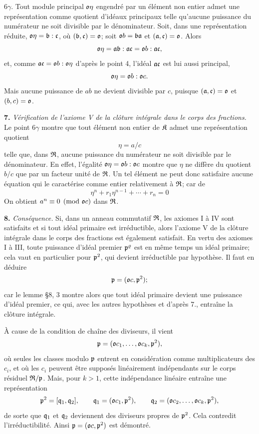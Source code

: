 6$\gamma$. Tout module principal $\mathfrak{o}\eta$ engendré par un élément non entier admet une représentation comme quotient d'idéaux principaux telle qu'aucune puissance du numérateur ne soit divisible par le dénominateur. Soit, dans une représentation réduite, $\mathfrak{o}\eta=\mathfrak{b}:\mathfrak{c}$, où $(\mathfrak{b},\mathfrak{c})=\mathfrak{o}$; soit $\mathfrak{o} b=\mathfrak{b}\mathfrak{a}$ et $(\mathfrak{a},\mathfrak{c})=\mathfrak{o}$. Alors
\[
        \mathfrak{o}\eta=\mathfrak{a}\mathfrak{b}:\mathfrak{a}\mathfrak{c}=\mathfrak{o} b:\mathfrak{a}\mathfrak{c},
\]
et, comme $\mathfrak{a}\mathfrak{c}=\mathfrak{o} b:\mathfrak{o}\eta$ d'après le point 4, l'idéal $\mathfrak{a}\mathfrak{c}$ est lui aussi principal,
\[
        \mathfrak{o}\eta=\mathfrak{o} b:\mathfrak{o} c.
\]
Mais aucune puissance de $ab$ ne devient divisible par $c$, puisque $(\mathfrak{a},\mathfrak{c})=\mathfrak{o}$ et $(b,c)=\mathfrak{o}$.

\textbf{7.} \emph{Vérification de l'axiome V de la clôture intégrale dans le corps des fractions.} Le point 6$\gamma$ montre que tout élément non entier de $\mathfrak{K}$ admet une représentation quotient
\[
        \eta=a/c
\]
telle que, dans $\mathfrak{R}$, aucune puissance du numérateur ne soit divisible par le dénominateur. En effet, l'égalité $\mathfrak{o}\eta=\mathfrak{o} b:\mathfrak{o} c$ montre que $\eta$ ne diffère du quotient $b/c$ que par un facteur unité de $\mathfrak{R}$. Un tel élément ne peut donc satisfaire aucune équation qui le caractérise comme entier relativement à $\mathfrak{R}$; car de
\[
        \eta^n+r_1\eta^{n-1}+\cdots+r_n=0
\]
On obtient $a^n\equiv0\pmod{\mathfrak{o} c}$ dans $\mathfrak{R}$.

\textbf{8.} \emph{Conséquence.} Si, dans un anneau commutatif $\mathfrak{R}$, les axiomes I à IV sont satisfaits et si tout idéal primaire est irréductible, alors l'axiome V de la clôture intégrale dans le corps des fractions est également satisfait. En vertu des axiomes I à III, toute puissance d'idéal premier $\mathfrak{p}^\varrho$ est en même temps un idéal primaire; cela vaut en particulier pour $\mathfrak{p}^2$, qui devient irréductible par hypothèse. Il faut en déduire
\[
        \mathfrak{p}=(\mathfrak{o} c,\mathfrak{p}^2);
\]
car le lemme \S{}8, 3 montre alors que tout idéal primaire devient une puissance d'idéal premier, ce qui, avec les autres hypothèses et d'après 7., entraîne la clôture intégrale.

À cause de la condition de chaîne des diviseurs, il vient
\[
        \mathfrak{p}=(\mathfrak{o} c_1,\ldots,\mathfrak{o} c_k,\mathfrak{p}^2),
\]
où seules les classes modulo $\mathfrak{p}$ entrent en considération comme multiplicateurs des $c_i$, et où les $c_i$ peuvent être supposés linéairement indépendants sur le corps résiduel $\mathfrak{R}/\mathfrak{p}$. Mais, pour $k>1$, cette indépendance linéaire entraîne une représentation
\[
        \mathfrak{p}^2=[\mathfrak{q}_1,\mathfrak{q}_2],
        \qquad \mathfrak{q}_1=(\mathfrak{o} c_1,\mathfrak{p}^2),
        \qquad \mathfrak{q}_2=(\mathfrak{o} c_2,\ldots,\mathfrak{o} c_k,\mathfrak{p}^2),
\]
de sorte que $\mathfrak{q}_1$ et $\mathfrak{q}_2$ deviennent des diviseurs propres de $\mathfrak{p}^2$. Cela contredit l'irréductibilité. Ainsi $\mathfrak{p}=(\mathfrak{o} c,\mathfrak{p}^2)$ est démontré.

